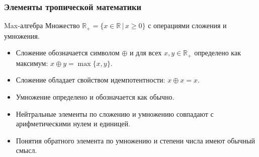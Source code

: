 \documentclass[ucs, notheorems, handout]{beamer}
\begin{document}


\begin{frame}
    \frametitle{Элементы тропической математики}
    \begin{block}{Max-алгебра}
        Множество $\mathbb{R}_+ = \{x \in \mathbb{R} \, |\, x \geq 0\}$ с операциями сложения и умножения.
    \end{block}
    \begin{itemize}
        \item Сложение обозначается символом $\oplus$ и для всех $x,y\in\mathbb{R}_{+}$ определено как максимум: $x\oplus y=\max\{x,y\}$.
        \item Сложение обладает свойством идемпотентности: $x\oplus x=x$.
        \item Умножение определено и обозначается как обычно.
        \item Нейтральные элементы по сложению и умножению совпадают с арифметическими нулем и единицей.
        \item Понятия обратного элемента по умножению и степени числа имеют обычный смысл. 
    \end{itemize}
\end{frame}
\end{document}
